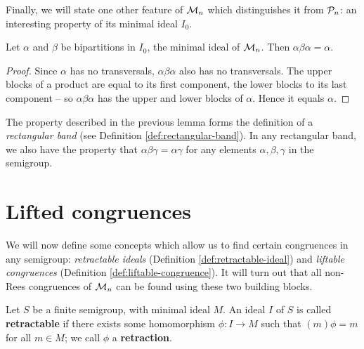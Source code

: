 Finally, we will state one other feature of $\mathcal{M}_n$ which distinguishes it from
$\mathcal{P}_n$: an interesting property of its minimal ideal $I_0$.

\begin{lemma}
  \label{lem:i0-rect-band}
  Let $\alpha$ and $\beta$ be bipartitions in $I_0$, the minimal ideal of
  $\mathcal{M}_n$.  Then $\alpha \beta \alpha = \alpha$.
  \begin{proof}
    Since $\alpha$ has no transversals, $\alpha\beta\alpha$ also has no
    transversals.  The upper blocks of a product are equal to its first
    component, the lower blocks to its last component -- so $\alpha\beta\alpha$
    has the upper and lower blocks of $\alpha$.  Hence it equals $\alpha$.
  \end{proof}
\end{lemma}

The property described in the previous lemma forms the definition of a
\textit{rectangular band} (see Definition \ref{def:rectangular-band}).  In any
rectangular band, we also have the property that
$\alpha\beta\gamma = \alpha\gamma$ for any elements $\alpha,\beta,\gamma$ in the
semigroup.

\section{Lifted congruences}
\label{sec:motzkin-prelim}
We will now define some concepts which allow us to find certain
congruences in any semigroup: \textit{retractable ideals} (Definition
\ref{def:retractable-ideal}) and \textit{liftable congruences} (Definition
\ref{def:liftable-congruence}).  It will turn out that all non-Rees congruences
of $\mathcal{M}_n$ can be found using these two building blocks.

\begin{definition}
  \label{def:retractable-ideal}
   
  Let $S$ be a finite semigroup, with minimal ideal $M$.  An ideal $I$ of $S$ is
  called \textbf{retractable} if there exists some homomorphism $\phi: I \to M$
  such that $(m)\phi = m$ for all $m \in M$; we call $\phi$ a
  \textbf{retraction}.
\end{definition}

